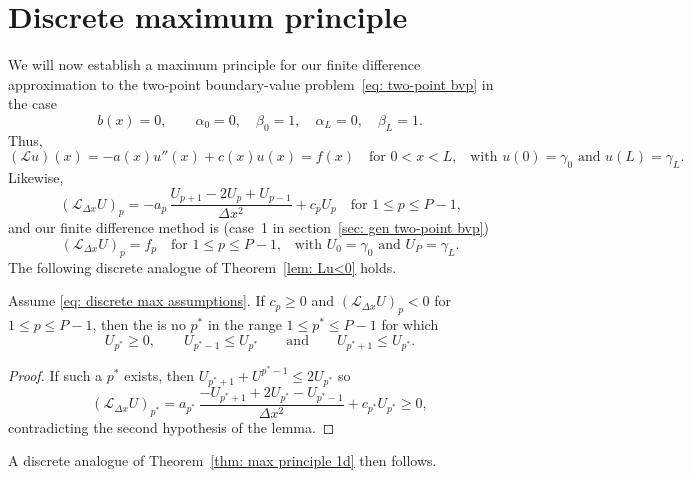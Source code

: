 \section{Discrete maximum principle}

We will now establish a maximum principle for our finite difference 
approximation to the two-point boundary-value problem~\eqref{eq: two-point bvp} 
in the case
\begin{equation}\label{eq: discrete max assumptions}
b(x)=0,\qquad\alpha_0=0,\quad\beta_0=1,\quad\alpha_L=0,\quad\beta_L=1.
\end{equation}
Thus, 
\begin{equation}\label{eq: simple Lu=f}
(\mathcal{L}u)(x)=-a(x)u''(x)+c(x)u(x)=f(x)\quad\text{for~$0<x<L$,}\quad
\text{with $u(0)=\gamma_0$~and $u(L)=\gamma_L$.}
\end{equation}
Likewise,
\[
(\mathcal{L}_{\Delta x}U)_p=-a_p\,\frac{U_{p+1}-2U_p+U_{p-1}}{\Delta x^2}
	+c_pU_p\quad\text{for $1\le p\le P-1$,}
\]
and our finite difference method is (case~1 in 
section~\ref{sec: gen two-point bvp})
\begin{equation}\label{eq: finite diff Dirichlet 1d}
(\mathcal{L}_{\Delta x}U)_p=f_p\quad\text{for $1\le p\le P-1$,}\quad
	\text{with $U_0=\gamma_0$ and $U_P=\gamma_L$.}
\end{equation}
The following discrete analogue of Theorem~\ref{lem: Lu<0} holds.

\begin{lemma}\label{lem: discrete LU<0}
Assume \eqref{eq: discrete max assumptions}.
If $c_p\ge0$ and $(\mathcal{L}_{\Delta x}U)_p<0$ for~$1\le p\le P-1$, then
the is no $p^*$ in the range $1\le p^*\le P-1$ for which
\[
U_{p^*}\ge 0,\qquad U_{p^*-1}\le U_{p^*}\qquad\text{and}\qquad
U_{p^*+1}\le U_{p^*}.
\]
\end{lemma}
\begin{proof}
If such a $p^*$ exists, then $U_{p^*+1}+U^{p^*-1}\le 2U_{p^*}$ so
\[
(\mathcal{L}_{\Delta x}U)_{p^*}
	=a_{p^*}\,\frac{-U_{p^*+1}+2U_{p^*}-U_{p^*-1}}{\Delta x^2}
	+c_{p^*}U_{p^*}\ge 0,
\]
contradicting the second hypothesis of the lemma.
\end{proof}

A discrete analogue of Theorem~\ref{thm: max principle 1d} then follows.

